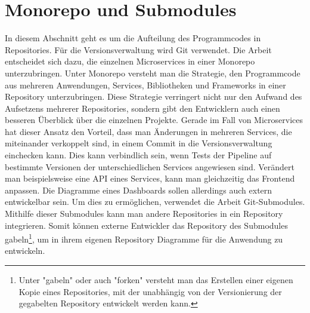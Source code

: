 \section{Monorepo und Submodules}
\label{sec:monorepoundsubmodules}
In diesem Abschnitt geht es um die Aufteilung des Programmcodes in Repositories. Für die Versionsverwaltung
wird Git verwendet. Die Arbeit entscheidet sich dazu, die einzelnen Microservices in einer Monorepo unterzubringen.
Unter Monorepo versteht man die Strategie, den Programmcode aus mehreren Anwendungen, Services, Bibliotheken und Frameworks
in einer Repository unterzubringen.\cite{MonorepoTrunkBasedDevelopment} Diese Strategie verringert nicht nur den Aufwand
des Aufsetzens mehrerer Repositories, sondern gibt den Entwicklern auch einen besseren Überblick über die einzelnen
Projekte. Gerade im Fall von Microservices hat dieser Ansatz den Vorteil, dass man Änderungen in mehreren Services,
die miteinander verkoppelt sind, in einem Commit in die Versionsverwaltung einchecken kann. Dies kann verbindlich sein,
wenn Tests der Pipeline auf bestimmte Versionen der unterschiedlichen Services angewiesen sind. Verändert man beispielsweise
eine API eines Services, kann man gleichzeitig das Frontend anpassen. Die Diagramme eines Dashboards sollen allerdings
auch extern entwickelbar sein. Um dies zu ermöglichen, verwendet die Arbeit Git-Submodules.\cite{GitsubmodulesGitSCM} Mithilfe dieser Submodules
kann man andere Repositories in ein Repository integrieren. Somit können externe Entwickler das Repository des
Submodules gabeln\footnote{Unter "gabeln" oder auch "forken" versteht man das Erstellen einer eigenen Kopie eines Repositories, mit der unabhängig von der Versionierung der gegabelten Repository entwickelt werden kann.},
um in ihrem eigenen Repository Diagramme für die Anwendung zu entwickeln.

